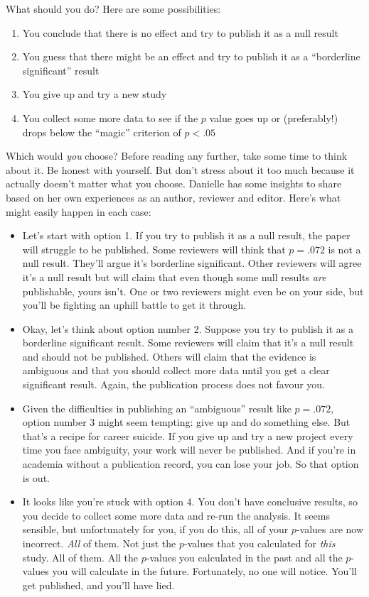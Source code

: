 \documentclass[
]{book}
\providecommand{\tightlist}{%
  \setlength{\itemsep}{0pt}\setlength{\parskip}{0pt}}
\theoremstyle{definition}
\theoremstyle{definition}
\theoremstyle{definition}
\theoremstyle{definition}
\theoremstyle{remark}
\begin{document}
What should you do? Here are some possibilities:

\begin{enumerate}
\def\labelenumi{\arabic{enumi}.}
\tightlist
\item
  You conclude that there is no effect and try to publish it as a null result
\item
  You guess that there might be an effect and try to publish it as a ``borderline significant'' result
\item
  You give up and try a new study
\item
  You collect some more data to see if the \(p\) value goes up or (preferably!) drops below the ``magic'' criterion of \(p<.05\)
\end{enumerate}

Which would \emph{you} choose? Before reading any further, take some time to think about it. Be honest with yourself. But don't stress about it too much because it actually doesn't matter what you choose. Danielle has some insights to share based on her own experiences as an author, reviewer and editor. Here's what might easily happen in each case:

\begin{itemize}
\item
  Let's start with option 1. If you try to publish it as a null result, the paper will struggle to be published. Some reviewers will think that \(p=.072\) is not a null result. They'll argue it's borderline significant. Other reviewers will agree it's a null result but will claim that even though some null results \emph{are} publishable, yours isn't. One or two reviewers might even be on your side, but you'll be fighting an uphill battle to get it through.
\item
  Okay, let's think about option number 2. Suppose you try to publish it as a borderline significant result. Some reviewers will claim that it's a null result and should not be published. Others will claim that the evidence is ambiguous and that you should collect more data until you get a clear significant result. Again, the publication process does not favour you.
\item
  Given the difficulties in publishing an ``ambiguous'' result like \(p=.072\), option number 3 might seem tempting: give up and do something else. But that's a recipe for career suicide. If you give up and try a new project every time you face ambiguity, your work will never be published. And if you're in academia without a publication record, you can lose your job. So that option is out.
\item
  It looks like you're stuck with option 4. You don't have conclusive results, so you decide to collect some more data and re-run the analysis. It seems sensible, but unfortunately for you, if you do this, all of your \(p\)-values are now incorrect. \emph{All} of them. Not just the \(p\)-values that you calculated for \emph{this} study. All of them. All the \(p\)-values you calculated in the past and all the \(p\)-values you will calculate in the future. Fortunately, no one will notice. You'll get published, and you'll have lied.
\end{itemize}
\end{document}
